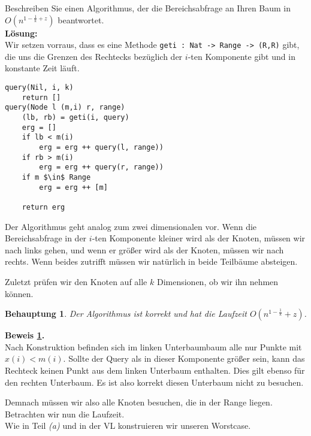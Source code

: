 \documentclass[11pt,a4paper,ngerman]{article}
\newtheorem{lemma}{\bfseries Behauptung}
\begin{document}
Beschreiben Sie einen Algorithmus, der die Bereichsabfrage an Ihren Baum in $O(n^{1-\frac{1}{k} + z})$ beantwortet.\\

\textbf{Lösung:}\\

Wir setzen vorraus, dass es eine Methode \lstinline|geti : Nat -> Range -> (R,R)| gibt,
die uns die Grenzen des Rechtecks bezüglich der $i$-ten Komponente gibt und in konstante Zeit läuft.

\begin{lstlisting}
query(Nil, i, k)
    return []
query(Node l (m,i) r, range)
    (lb, rb) = geti(i, query)
    erg = []
    if lb < m(i)
        erg = erg ++ query(l, range))
    if rb > m(i)
        erg = erg ++ query(r, range))
    if m $\in$ Range
        erg = erg ++ [m]

    return erg
\end{lstlisting}

Der Algorithmus geht analog zum zwei dimensionalen vor. Wenn die Bereichsabfrage in der $i$-ten Komponente kleiner wird als
der Knoten, müssen wir nach links gehen, und wenn er größer wird als der Knoten, müssen wir nach rechts.
Wenn beides zutrifft müssen wir natürlich in beide Teilbäume absteigen.

Zuletzt prüfen wir den Knoten auf alle $k$ Dimensionen, ob wir ihn nehmen können.\\

\begin{lemma}\label{alge:ueb10:kdquery}
    Der Algorithmus ist korrekt und hat die Laufzeit $O(n^{1-\frac{1}{k}} + z)$.
\end{lemma}

\textbf{Beweis \ref{alge:ueb10:kdquery}.}\\
    Nach Konstruktion befinden sich im linken Unterbaumbaum alle nur Punkte mit $x(i) < m(i)$. Sollte der
    Query als in dieser Komponente größer sein, kann das Rechteck keinen Punkt aus dem linken Unterbaum enthalten.
    Dies gilt ebenso für den rechten Unterbaum. Es ist also korrekt diesen Unterbaum nicht zu besuchen.

    Demnach müssen wir also alle Knoten besuchen, die in der Range liegen.\\

    Betrachten wir nun die Laufzeit.\\

    Wie in Teil \emph{(a)} und in der VL konstruieren wir unseren Worstcase.
    
\end{document}
